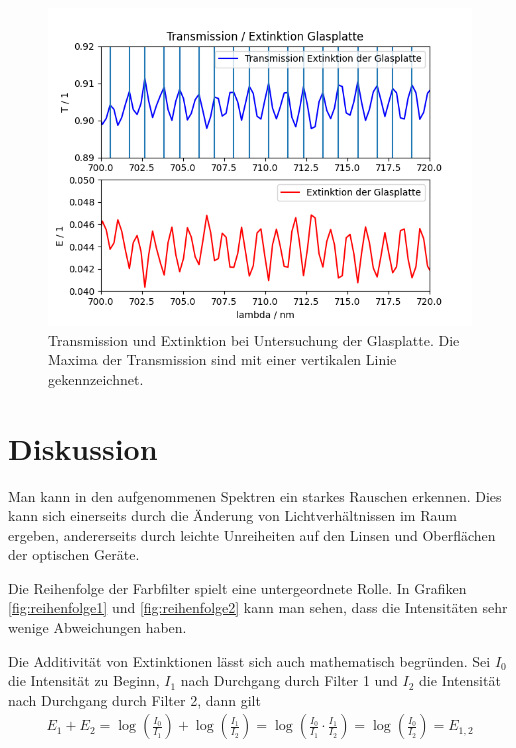 \documentclass{article}
\begin{document}
\begin{figure}[H]
\centering
\caption{Transmission und Extinktion bei Untersuchung der Glasplatte. Die Maxima der Transmission sind mit einer vertikalen Linie gekennzeichnet.}
\label{fig:T_glas}
\includegraphics[scale=0.7]{Glas_Transmission_Extinktion.png}
\end{figure}





\section{Diskussion}

Man kann in den aufgenommenen Spektren ein starkes Rauschen erkennen. Dies kann sich einerseits durch die Änderung von Lichtverhältnissen im Raum ergeben, andererseits durch leichte Unreiheiten auf den Linsen und Oberflächen der optischen Geräte.

Die Reihenfolge der Farbfilter spielt eine untergeordnete Rolle. In Grafiken \ref{fig:reihenfolge1} und \ref{fig:reihenfolge2} kann man sehen, dass die Intensitäten sehr wenige Abweichungen haben.

Die Additivität von Extinktionen lässt sich auch mathematisch begründen. Sei $I_0$ die Intensität zu Beginn, $I_1$ nach Durchgang durch Filter 1 und $I_2$ die Intensität nach Durchgang durch Filter 2, dann gilt
\begin{align*}
E_1 + E_2 = \log\left(\frac{I_0}{I_1}\right) + \log\left(\frac{I_1}{I_2}\right) = \log\left(\frac{I_0}{I_1}\cdot \frac{I_1}{I_2}\right) = \log\left(\frac{I_0}{I_2}\right) = E_{1,2}
\end{align*}
\end{document}

